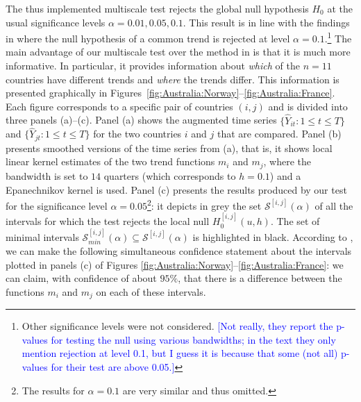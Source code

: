 \documentclass[a4paper,12pt]{article}
\makeatletter
\renewcommand{\eqref}[1]{\tagform@{\ref{#1}}}
\makeatother
\begin{document}
The thus implemented multiscale test rejects the global null hypothesis $H_0$ at the usual significance levels $\alpha =0.01,0.05, 0.1$. 
This result is in line with the findings in \cite{Zhang2012} where the null hypothesis of a common trend is rejected at level $\alpha = 0.1$.\footnote{Other significance levels were not considered. \textcolor{blue}{[Not really, they report the p-values for testing the null using various bandwidths; in the text they only mention rejection at level 0.1, but I guess it is because that some (not all) p-values for their test are above 0.05.]}} The main advantage of our multiscale test over the method in \cite{Zhang2012} is that it is much more informative. In particular, it provides information about \textit{which} of the $n=11$ countries have different trends and \textit{where} the trends differ. This information is presented graphically in Figures~\ref{fig:Australia:Norway}--\ref{fig:Australia:France}. Each figure corresponds to a specific pair of countries $(i, j)$ 
and is divided into three panels (a)--(c). 
Panel (a) shows the augmented time series $\{\widehat{Y}_{it}: 1 \le t \le T\}$ and $\{\widehat{Y}_{jt}: 1 \le t \le T\}$ for the two countries $i$ and $j$ that are compared. 
Panel (b) presents smoothed versions of the time series from (a), that is, it shows local linear kernel estimates of the two trend functions $m_i$ and $m_j$, where the bandwidth is set to $14$ quarters (which corresponds to $h = 0.1$) and a Epanechnikov kernel is used. Panel (c) presents the results produced by our test for the significance level $\alpha = 0.05$\footnote{The results for $\alpha = 0.1$ are very similar and thus omitted.}: it depicts in grey the set $\mathcal{S}^{[i, j]}(\alpha)$ of all the intervals for which the test rejects the local null $H_0^{[i, j]}(u, h)$. The set of minimal intervals $\mathcal{S}^{[i, j]}_{min}(\alpha) \subseteq \mathcal{S}^{[i, j]}(\alpha)$ is highlighted in black. According to \eqref{eq:CS-v2}, we can make the following simultaneous confidence statement about the intervals plotted in panels (c) of Figures \ref{fig:Australia:Norway}--\ref{fig:Australia:France}: we can claim, with confidence of about $95\%$, that there is a difference between the functions $m_i$ and $m_j$ on each of these intervals. 
\end{document}
